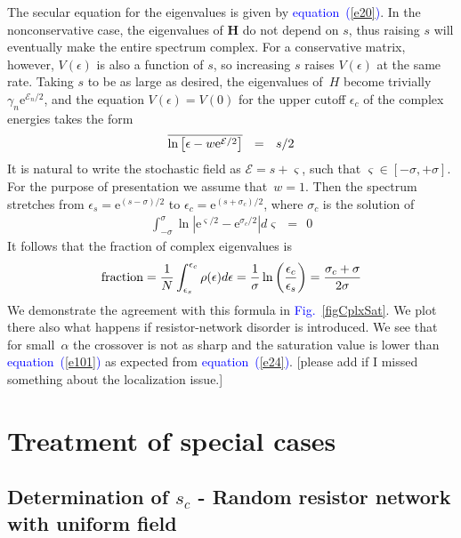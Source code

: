 \documentclass[aps,pre,floats,floatfix,twocolumn]{revtex4}
\newcommand{\eexp}[1]{\mathrm{e}^{#1}}
\newcommand{\be}[1]{\begin{eqnarray}\ifthenelse{#1=-1}{\nonumber}{\ifthenelse{#1=0}{}{\label{e#1}}}}
\newcommand{\beq}{\begin{eqnarray}}
\newcommand{\eeq}{\end{eqnarray}}
\newcommand{\Eq}[1]{\textcolor{blue}{{equation}\!~(\ref{#1})}}
\newcommand{\Fig}[1]{\textcolor{blue}{Fig.}\!\!~\ref{#1}}
\newcommand{\rmrk}[1]{{\color[rgb]{0.6,0,0.1} #1}}
\begin{document}
The secular equation for the eigenvalues is given by \Eq{e20}.
%
In the nonconservative case, the eigenvalues of $\bm{H}$ do not depend on $s$,
thus raising $s$ will eventually make the entire spectrum complex. 
For a conservative matrix, however, $V(\epsilon)$ is also a function of $s$, 
so increasing $s$ raises $V(\epsilon)$  at the same rate.
%
Taking $s$ to be as large as desired, the eigenvalues of~$H$ 
become trivially $\gamma_{n}\eexp{\mathcal{E}_n/2}$, 
and the equation $V(\epsilon)=V(0)$ for the upper cutoff $\epsilon_c$ 
of the complex energies takes the form
%
\be{24}
\overline{\ln\left[ \epsilon - w\eexp{\mathcal{E}/2} \right]} \ \ = \ \ s/2 
\eeq
%
It is natural to write the stochastic field as $\mathcal{E}=s+\varsigma$, 
such that ${\varsigma\in[-\sigma,+\sigma]}$. 
For the purpose of presentation we assume that~$w{=}1$.  
Then the spectrum stretches from $\epsilon_s=\eexp{(s-\sigma)/2}$ 
to ${\epsilon_c=\eexp{(s+\sigma_c)/2}}$,  
where $\sigma_c$ is the solution of
%
\beq
\int_{-\sigma}^{\sigma} \ln \left| \eexp{{\varsigma}/2} - \eexp{\sigma_c /2}\right| d\varsigma  \ \ = \ \ 0 
\eeq
% 
It follows that the fraction of complex eigenvalues is 
%
\be{101}
\text{fraction} 
= \frac{1}{N}\int_{\epsilon_s}^{\epsilon_c} \rho(\epsilon) d\epsilon
= \frac{1}{\sigma}\ln\left( \frac{\epsilon_c}{\epsilon_s} \right) 
= \frac{\sigma_c + \sigma}{2\sigma}
\eeq
%
We demonstrate the agreement with this formula in \Fig{figCplxSat}.
We plot there also what happens if resistor-network disorder is introduced.
We see that for small~$\alpha$ the crossover is not as sharp and 
the saturation value is lower than \Eq{e101} as expected from \Eq{e24}. 
\rmrk{[please add if I missed something about the localization issue.]}




\section{Treatment of special cases} 


\subsection{Determination of $s_c$ - Random resistor network with uniform field} 
\label{s8_1}
\end{document}

